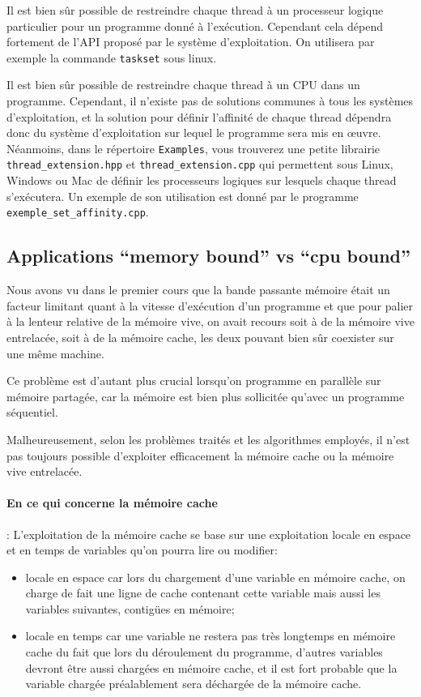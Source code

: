 \documentclass[fleqn,11pt]{article}
\begin{document}
Il est bien sûr possible de restreindre chaque thread à un processeur logique particulier pour un programme donné à l'exécution. Cependant cela dépend fortement de l'API proposé par le système d'exploitation. On utilisera par exemple la commande \texttt{taskset} sous linux.

Il est bien sûr possible de restreindre chaque thread à un CPU dans un programme. Cependant, il n'existe pas de solutions communes à tous les systèmes d'exploitation, et la solution pour définir l'affinité de chaque thread dépendra donc du système d'exploitation sur lequel le programme sera mis en {\oe}uvre. Néanmoins, dans le répertoire \texttt{Examples}, vous trouverez une petite librairie \texttt{thread\_extension.hpp} et
\texttt{thread\_extension.cpp} qui permettent sous Linux, Windows ou Mac de définir les processeurs logiques
sur lesquels chaque thread s'exécutera. Un exemple de son utilisation est donné par le programme
\texttt{exemple\_set\_affinity.cpp}.

\subsection{Applications ``memory bound'' vs ``cpu bound''}

Nous avons vu dans le premier cours que la bande passante mémoire était un facteur limitant quant à la vitesse d'exécution d'un programme et que pour palier à la lenteur relative de la mémoire vive, on avait recours soit à de la mémoire vive entrelacée, soit à de la mémoire cache, les deux pouvant bien sûr coexister sur une même machine.

Ce problème est d'autant plus crucial lorsqu'on programme en parallèle sur mémoire partagée, car la mémoire
est bien plus sollicitée qu'avec un programme séquentiel.

Malheureusement, selon les problèmes traités et les algorithmes employés, il n'est pas toujours possible d'exploiter efficacement la mémoire cache ou la mémoire vive entrelacée.

\paragraph{En ce qui concerne la mémoire cache} : L'exploitation de la mémoire cache se base sur une exploitation locale en espace et en temps de variables qu'on pourra lire ou modifier:
\begin{itemize}
 \item locale en espace car lors du chargement d'une variable en mémoire cache, on charge de fait une ligne de cache  contenant cette variable mais aussi les variables suivantes, contigües en mémoire;
 \item locale en temps  car une variable ne restera pas très longtemps en mémoire cache du fait que lors du déroulement du programme, d'autres variables devront être aussi chargées en mémoire cache, et il est fort probable que la variable chargée préalablement sera déchargée de la mémoire cache.
\end{itemize}
\end{document}
